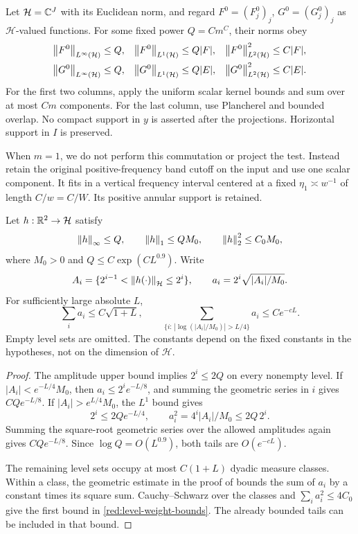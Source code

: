 Let \(\mathcal H=\mathbb C^J\) with its Euclidean norm, and regard
\(F^0=(F_j^0)_j\), \(G^0=(G_j^0)_j\) as \(\mathcal H\)-valued
functions. For some fixed power \(Q=Cm^C\), their norms obey
\begin{equation}\label{red:bin-vector-norms}
 \begin{aligned}
 \left\|F^0\right\|_{L^\infty(\mathcal H)}&\le Q,&
 \left\|F^0\right\|_{L^1(\mathcal H)}&\le Q|F|,&
 \left\|F^0\right\|_{L^2(\mathcal H)}^2&\le C|F|,\\
 \left\|G^0\right\|_{L^\infty(\mathcal H)}&\le Q,&
 \left\|G^0\right\|_{L^1(\mathcal H)}&\le Q|E|,&
 \left\|G^0\right\|_{L^2(\mathcal H)}^2&\le C|E|.
 \end{aligned}
\end{equation}
For the first two columns, apply the uniform scalar kernel bounds
and sum over at most \(Cm\) components. For the last column, use
Plancherel and bounded overlap. No compact support in \(y\) is
asserted after the projections. Horizontal support in \(I\) is
preserved.

When \(m=1\), we do not perform this commutation or project the
test. Instead retain the original positive-frequency band cutoff
on the input and use one scalar component. It fits in a vertical
frequency interval centered at a fixed \(\eta_1\asymp w^{-1}\)
of length \(C/w=C/W\). Its positive annular support is retained.

\begin{lemma}
\label{red:bin-levels}
Let \(h:\mathbb R^2\to\mathcal H\) satisfy
\[
 \left\|h\right\|_\infty\le Q,\qquad
 \left\|h\right\|_1\le Q M_0,\qquad
 \left\|h\right\|_2^2\le C_0M_0,
\]
where \(M_0>0\) and \(Q\le C\exp(C L^{0.9})\).
Write
\[
 A_i=\{2^{i-1}<\left\|h(\cdot)\right\|_{\mathcal H}\le2^i\},
 \qquad a_i=2^i\sqrt{|A_i|/M_0}.
\]
For sufficiently large absolute \(L\),
\begin{equation}\label{red:level-weight-bounds}
 \sum_i a_i\le C\sqrt{1+L},\qquad
 \sum_{\{i:\,|\log(|A_i|/M_0)|>L/4\}}a_i
       \le C e^{-cL}.
\end{equation}
Empty level sets are omitted. The constants depend on the fixed
constants in the hypotheses, not on the dimension of \(\mathcal H\).
\end{lemma}

\begin{proof}
The amplitude upper bound implies \(2^i\le2Q\) on every nonempty
level. If \(|A_i|<e^{-L/4}M_0\), then
\(a_i\le2^i e^{-L/8}\), and summing the geometric series in
\(i\) gives \(C Qe^{-L/8}\).
If \(|A_i|>e^{L/4}M_0\), the \(L^1\) bound gives
\[
 2^i\le2Qe^{-L/4},\qquad
 a_i^2=4^i|A_i|/M_0\le2Q\,2^i.
\]
Summing the square-root geometric series over the allowed amplitudes
again gives \(C Qe^{-L/8}\). Since
\(\log Q=O(L^{0.9})\), both tails are \(O(e^{-cL})\).

The remaining level sets occupy at most \(C(1+L)\) dyadic measure
classes. Within a class, the geometric estimate in the proof of
 bounds the sum of \(a_i\) by a
constant times its square sum. Cauchy--Schwarz over the classes and
\(\sum_i a_i^2\le4C_0\) give the first bound in
\eqref{red:level-weight-bounds}. The already bounded tails can be
included in that bound.
\end{proof}

